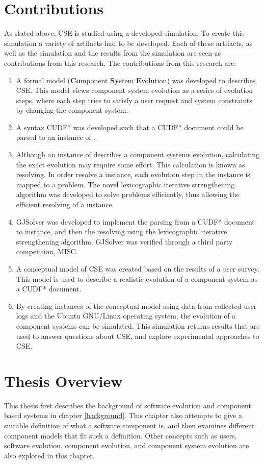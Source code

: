 \section{Contributions}
As stated above, CSE is studied using a developed simulation.
To create this simulation a variety of artifacts had to be developed.
Each of these artifacts, as well as the simulation and the results from the simulation are seen as contributions from this research. 
The contributions from this research are:
\begin{enumerate}
  \item A formal model \modelname (\textbf{Co}mponent \textbf{Sy}stem \textbf{E}volution) was developed to describes CSE. 
  This model views component system evolution as a series of evolution steps, where each step tries to satisfy a user request and system constraints by changing the component system.
  \item A syntax CUDF* was developed such that a CUDF* document could be parsed to an instance of \modelname. 
  \item Although an instance of \modelname describes a component systems evolution, calculating the exact evolution may require some effort.
  This calculation is known as resolving.
  In order resolve a \modelname instance, each evolution step in the instance is mapped to a \modelimpl problem.
  The novel lexicographic iterative strengthening algorithm was developed to solve \modelimpl problems efficiently, thus allowing the efficient resolving of a \modelname instance.
  \item GJSolver was developed to implement the parsing from a CUDF* document to \modelname instance, and then the resolving using the lexicographic iterative strengthening algorithm.
  GJSolver was verified through a third party competition, MISC.
  \item A conceptual model of CSE was created based on the results of a user survey. 
  This model is used to describe a realistic evolution of a component system as a CUDF* document. 
  \item By creating instances of the conceptual model using data from collected user logs and the Ubuntu GNU/Linux operating system,
  the evolution of a component systems can be simulated.
  This simulation returns results that are used to answer questions about CSE, and explore experimental approaches to CSE.
\end{enumerate}


\section{Thesis Overview}
This thesis first describes the background of software evolution and component based systems in chapter \ref{background}.
This chapter also attempts to give a suitable definition of what a software component is, and then examines different component models that fit such a definition.
Other concepts such as users, software evolution, component evolution, and component system evolution are also explored in this chapter.

